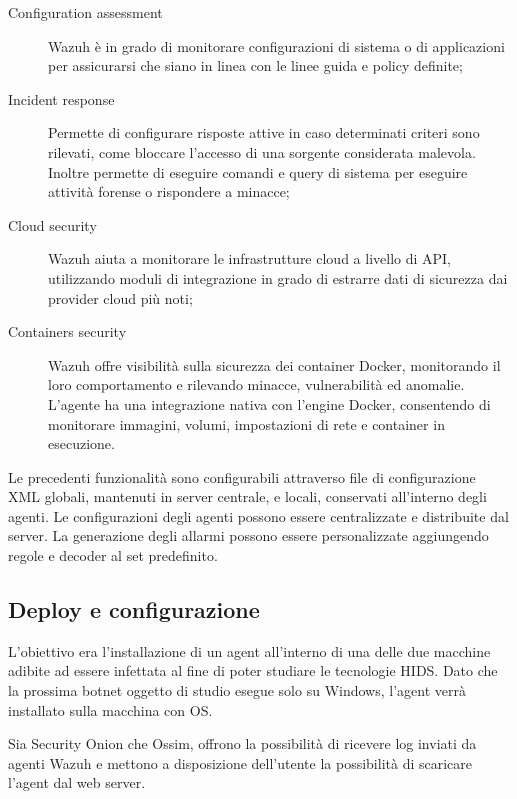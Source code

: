 \begin{description}
    \item [Configuration assessment] Wazuh è in grado di monitorare configurazioni di sistema o di applicazioni per assicurarsi che siano in linea con le linee guida e policy definite;
    \item [Incident response] Permette di configurare risposte attive in caso determinati criteri sono rilevati, come bloccare l'accesso di una sorgente considerata malevola. Inoltre permette di eseguire comandi e query di sistema per eseguire attività forense o rispondere a minacce;
    \item [Cloud security] Wazuh aiuta a monitorare le infrastrutture cloud a livello di API, utilizzando moduli di integrazione in grado di estrarre dati di sicurezza dai provider cloud più noti;
    \item [Containers security] Wazuh offre visibilità sulla sicurezza dei container Docker, monitorando il loro comportamento e rilevando minacce, vulnerabilità ed anomalie. L'agente  ha una integrazione nativa con l'engine Docker, consentendo di monitorare immagini, volumi, impostazioni di rete e container in esecuzione.
\end{description}

Le precedenti funzionalità sono configurabili attraverso file di configurazione XML globali, mantenuti in server centrale, e locali, conservati all'interno degli agenti. Le configurazioni degli agenti possono essere centralizzate e distribuite dal server. La generazione degli allarmi possono essere personalizzate aggiungendo regole e decoder al set predefinito.


\subsection{Deploy e configurazione}
 L'obiettivo era l'installazione di un agent all'interno di una delle due macchine adibite ad essere infettata al fine di poter studiare le tecnologie  HIDS. Dato che la prossima botnet oggetto di studio esegue solo su Windows, l'agent verrà installato sulla macchina con OS.
 
Sia Security Onion che Ossim, offrono la possibilità di ricevere log inviati da agenti Wazuh  e mettono a disposizione dell'utente la possibilità di scaricare l'agent dal web server.

